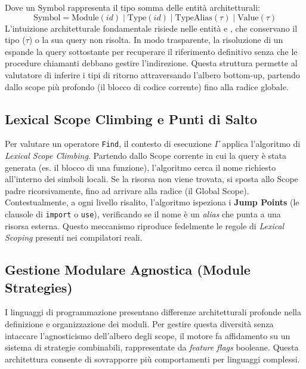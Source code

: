 Dove un $\text{Symbol}$ rappresenta il tipo somma delle entità architetturali:
$$ \text{Symbol} = \text{Module}(id) \mid \text{Type}(id) \mid \text{TypeAlias}(\tau) \mid
\text{Value}(\tau) $$
L'intuizione architetturale fondamentale risiede nelle entità
 e , che conservano il tipo ($\tau$) o la sua query non
risolta. In modo trasparente, la risoluzione di un  espande la query sottostante per recuperare il riferimento definitivo senza che le procedure chiamanti debbano gestire l'indirezione. Questa struttura permette al valutatore di inferire i tipi
di ritorno attraversando l'albero bottom-up, partendo dallo scope più
profondo (il blocco di codice corrente) fino alla radice globale.

\subsection{Lexical Scope Climbing e Punti di Salto}
Per valutare un operatore \texttt{Find}, il contesto di esecuzione
$\Gamma$ applica l'algoritmo di \textit{Lexical Scope Climbing}. Partendo
dallo Scope corrente in cui la query è stata generata
(es. il blocco di una funzione), l'algoritmo cerca il nome richiesto
all'interno dei simboli locali.
Se la risorsa non viene trovata, si sposta allo Scope padre
ricorsivamente, fino ad arrivare alla radice (il Global Scope).
Contestualmente, a ogni livello risalito, l'algoritmo
ispeziona i \textbf{Jump Points} (le clausole di \texttt{import} o
\texttt{use}), verificando se il nome è un \textit{alias} che punta a
una risorsa esterna. Questo meccanismo riproduce fedelmente le regole
di \textit{Lexical Scoping} presenti nei compilatori reali.

\subsection{Gestione Modulare Agnostica (Module Strategies)}
I linguaggi di programmazione presentano differenze architetturali
profonde nella definizione e organizzazione dei moduli. Per gestire
questa diversità senza intaccare l'agnosticismo dell'albero degli
scope, il motore fa affidamento su un sistema di strategie
combinabili, rappresentate da \textit{feature flags} booleane. Questa
architettura consente di sovrapporre più comportamenti per linguaggi complessi.

